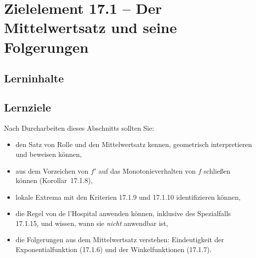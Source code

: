 \documentclass[a4paper,12pt]{article}
\begin{document}
\newpage

\section*{Zielelement 17.1 -- Der Mittelwertsatz und seine Folgerungen}

\subsection*{Lerninhalte}

\begin{center}
\end{center}

\subsection*{Lernziele}

Nach Durcharbeiten dieses Abschnitts sollten Sie:
\begin{itemize}
  \item den Satz von Rolle und den Mittelwertsatz kennen, geometrisch interpretieren
        und beweisen können,
  \item aus dem Vorzeichen von $f'$ auf das Monotonieverhalten von $f$ schließen
        können (Korollar~17.1.8),
  \item lokale Extrema mit den Kriterien 17.1.9 und 17.1.10 identifizieren können,
  \item die Regel von de l'Hospital anwenden können, inklusive des Spezialfalls 17.1.15,
        und wissen, wann sie \emph{nicht} anwendbar ist,
  \item die Folgerungen aus dem Mittelwertsatz verstehen: Eindeutigkeit der
        Exponentialfunktion (17.1.6) und der Winkelfunktionen (17.1.7).
\end{itemize}
\end{document}

